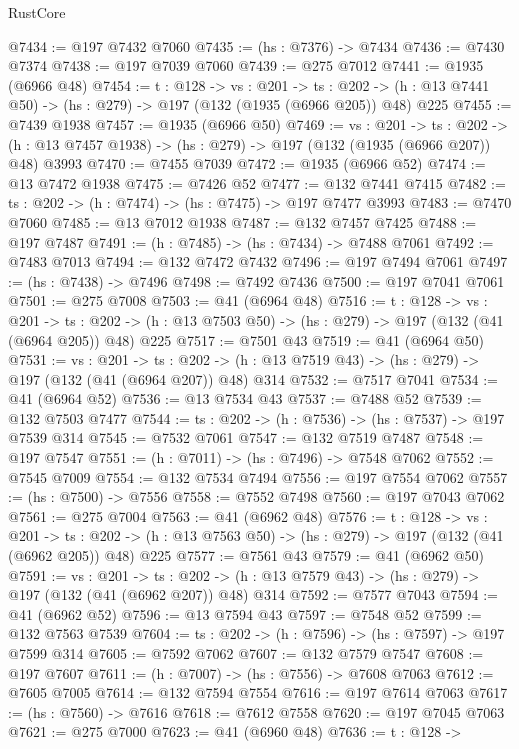 \begin{lexlean}{RustCore}
\begin{coremodule}
@7434 := @197 @7432 @7060
@7435 := (hs : @7376) -> @7434
@7436 := @7430 @7374
@7438 := @197 @7039 @7060
@7439 := @275 @7012
@7441 := @1935 (@6966 @48)
@7454 := {t : @128} ->
  {vs : @201} ->
  {ts : @202} -> (h : @13 @7441 @50) -> (hs : @279) -> @197 (@132 (@1935 (@6966 @205)) @48) @225
@7455 := @7439 @1938
@7457 := @1935 (@6966 @50)
@7469 := {vs : @201} ->
  {ts : @202} -> (h : @13 @7457 @1938) -> (hs : @279) -> @197 (@132 (@1935 (@6966 @207)) @48) @3993
@7470 := @7455 @7039
@7472 := @1935 (@6966 @52)
@7474 := @13 @7472 @1938
@7475 := @7426 @52
@7477 := @132 @7441 @7415
@7482 := {ts : @202} -> (h : @7474) -> (hs : @7475) -> @197 @7477 @3993
@7483 := @7470 @7060
@7485 := @13 @7012 @1938
@7487 := @132 @7457 @7425
@7488 := @197 @7487
@7491 := (h : @7485) -> (hs : @7434) -> @7488 @7061
@7492 := @7483 @7013
@7494 := @132 @7472 @7432
@7496 := @197 @7494 @7061
@7497 := (hs : @7438) -> @7496
@7498 := @7492 @7436
@7500 := @197 @7041 @7061
@7501 := @275 @7008
@7503 := @41 (@6964 @48)
@7516 := {t : @128} ->
  {vs : @201} ->
  {ts : @202} -> (h : @13 @7503 @50) -> (hs : @279) -> @197 (@132 (@41 (@6964 @205)) @48) @225
@7517 := @7501 @43
@7519 := @41 (@6964 @50)
@7531 := {vs : @201} ->
  {ts : @202} -> (h : @13 @7519 @43) -> (hs : @279) -> @197 (@132 (@41 (@6964 @207)) @48) @314
@7532 := @7517 @7041
@7534 := @41 (@6964 @52)
@7536 := @13 @7534 @43
@7537 := @7488 @52
@7539 := @132 @7503 @7477
@7544 := {ts : @202} -> (h : @7536) -> (hs : @7537) -> @197 @7539 @314
@7545 := @7532 @7061
@7547 := @132 @7519 @7487
@7548 := @197 @7547
@7551 := (h : @7011) -> (hs : @7496) -> @7548 @7062
@7552 := @7545 @7009
@7554 := @132 @7534 @7494
@7556 := @197 @7554 @7062
@7557 := (hs : @7500) -> @7556
@7558 := @7552 @7498
@7560 := @197 @7043 @7062
@7561 := @275 @7004
@7563 := @41 (@6962 @48)
@7576 := {t : @128} ->
  {vs : @201} ->
  {ts : @202} -> (h : @13 @7563 @50) -> (hs : @279) -> @197 (@132 (@41 (@6962 @205)) @48) @225
@7577 := @7561 @43
@7579 := @41 (@6962 @50)
@7591 := {vs : @201} ->
  {ts : @202} -> (h : @13 @7579 @43) -> (hs : @279) -> @197 (@132 (@41 (@6962 @207)) @48) @314
@7592 := @7577 @7043
@7594 := @41 (@6962 @52)
@7596 := @13 @7594 @43
@7597 := @7548 @52
@7599 := @132 @7563 @7539
@7604 := {ts : @202} -> (h : @7596) -> (hs : @7597) -> @197 @7599 @314
@7605 := @7592 @7062
@7607 := @132 @7579 @7547
@7608 := @197 @7607
@7611 := (h : @7007) -> (hs : @7556) -> @7608 @7063
@7612 := @7605 @7005
@7614 := @132 @7594 @7554
@7616 := @197 @7614 @7063
@7617 := (hs : @7560) -> @7616
@7618 := @7612 @7558
@7620 := @197 @7045 @7063
@7621 := @275 @7000
@7623 := @41 (@6960 @48)
@7636 := {t : @128} ->

\end{coremodule}
\end{lexlean}

